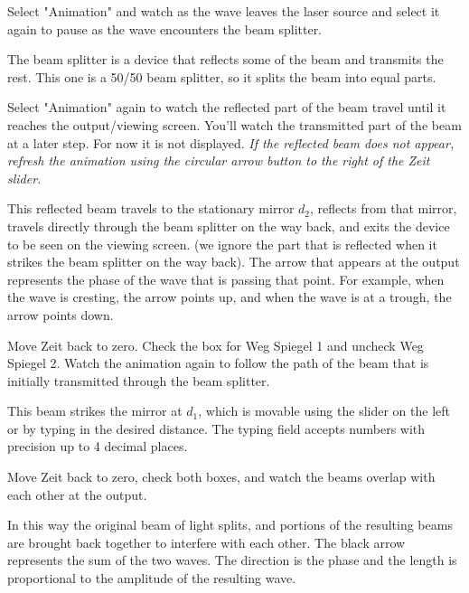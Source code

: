 \begin{steps}
	\item Select "Animation" and watch as the wave leaves the laser source and select it again to pause as the wave encounters the beam splitter.
\end{steps}

The beam splitter is a device that reflects some of the beam and transmits the rest. This one is a 50/50 beam splitter, so it splits the beam into equal parts.

\begin{steps}
	\item Select "Animation" again to watch the reflected part of the beam travel until it reaches the output/viewing screen. You'll watch the transmitted part of the beam at a later step. For now it is not displayed. \textit{If the reflected beam does not appear, refresh the animation using the circular arrow button to the right of the Zeit slider.}
\end{steps}

This reflected beam travels to the stationary mirror $d_2$, reflects from that mirror, travels directly through the beam splitter on the way back, and exits the device to be seen on the viewing screen. (we ignore the part that is reflected when it strikes the beam splitter on the way back). The arrow that appears at the output represents the phase of the wave that is passing that point. For example, when the wave is cresting, the arrow points up, and when the wave is at a trough, the arrow points down.

\begin{steps}
	\item Move Zeit back to zero. Check the box for Weg Spiegel 1 and uncheck Weg Spiegel 2. Watch the animation again to follow the path of the beam that is initially transmitted through the beam splitter.
\end{steps}

This beam strikes the mirror at $d_1$, which is movable using the slider on the left or by typing in the desired distance. The typing field accepts numbers with precision up to 4 decimal places.

\begin{steps}
	\item Move Zeit back to zero, check both boxes, and watch the beams overlap with each other at the output.
\end{steps}

In this way the original beam of light splits, and portions of the resulting beams are brought back together to interfere with each other. The black arrow represents the sum of the two waves. The direction is the phase and the length is proportional to the amplitude of the resulting wave.

